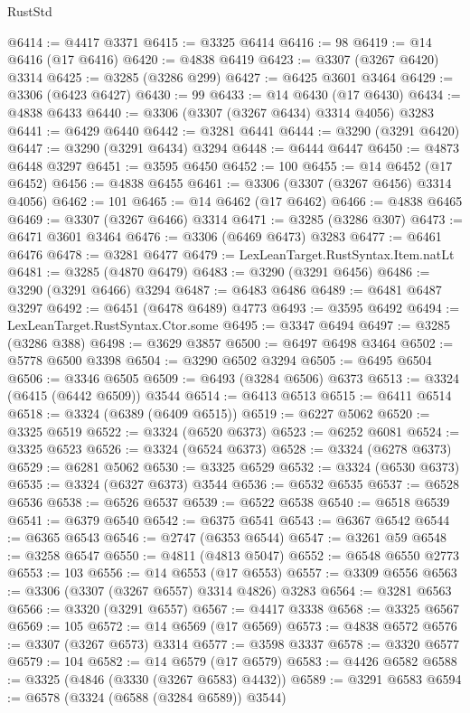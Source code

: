\begin{lexlean}{RustStd}
\begin{coremodule}
@6414 := @4417 @3371
@6415 := @3325 @6414
@6416 := 98
@6419 := @14 @6416 (@17 @6416)
@6420 := @4838 @6419
@6423 := @3307 (@3267 @6420) @3314
@6425 := @3285 (@3286 @299)
@6427 := @6425 @3601 @3464
@6429 := @3306 (@6423 @6427)
@6430 := 99
@6433 := @14 @6430 (@17 @6430)
@6434 := @4838 @6433
@6440 := @3306 (@3307 (@3267 @6434) @3314 @4056) @3283
@6441 := @6429 @6440
@6442 := @3281 @6441
@6444 := @3290 (@3291 @6420)
@6447 := @3290 (@3291 @6434) @3294
@6448 := @6444 @6447
@6450 := @4873 @6448 @3297
@6451 := @3595 @6450
@6452 := 100
@6455 := @14 @6452 (@17 @6452)
@6456 := @4838 @6455
@6461 := @3306 (@3307 (@3267 @6456) @3314 @4056)
@6462 := 101
@6465 := @14 @6462 (@17 @6462)
@6466 := @4838 @6465
@6469 := @3307 (@3267 @6466) @3314
@6471 := @3285 (@3286 @307)
@6473 := @6471 @3601 @3464
@6476 := @3306 (@6469 @6473) @3283
@6477 := @6461 @6476
@6478 := @3281 @6477
@6479 := LexLeanTarget.RustSyntax.Item.natLt
@6481 := @3285 (@4870 @6479)
@6483 := @3290 (@3291 @6456)
@6486 := @3290 (@3291 @6466) @3294
@6487 := @6483 @6486
@6489 := @6481 @6487 @3297
@6492 := @6451 (@6478 @6489) @4773
@6493 := @3595 @6492
@6494 := LexLeanTarget.RustSyntax.Ctor.some
@6495 := @3347 @6494
@6497 := @3285 (@3286 @388)
@6498 := @3629 @3857
@6500 := @6497 @6498 @3464
@6502 := @5778 @6500 @3398
@6504 := @3290 @6502 @3294
@6505 := @6495 @6504
@6506 := @3346 @6505
@6509 := @6493 (@3284 @6506) @6373
@6513 := @3324 (@6415 (@6442 @6509)) @3544
@6514 := @6413 @6513
@6515 := @6411 @6514
@6518 := @3324 (@6389 (@6409 @6515))
@6519 := @6227 @5062
@6520 := @3325 @6519
@6522 := @3324 (@6520 @6373)
@6523 := @6252 @6081
@6524 := @3325 @6523
@6526 := @3324 (@6524 @6373)
@6528 := @3324 (@6278 @6373)
@6529 := @6281 @5062
@6530 := @3325 @6529
@6532 := @3324 (@6530 @6373)
@6535 := @3324 (@6327 @6373) @3544
@6536 := @6532 @6535
@6537 := @6528 @6536
@6538 := @6526 @6537
@6539 := @6522 @6538
@6540 := @6518 @6539
@6541 := @6379 @6540
@6542 := @6375 @6541
@6543 := @6367 @6542
@6544 := @6365 @6543
@6546 := @2747 (@6353 @6544)
@6547 := @3261 @59
@6548 := @3258 @6547
@6550 := @4811 (@4813 @5047)
@6552 := @6548 @6550 @2773
@6553 := 103
@6556 := @14 @6553 (@17 @6553)
@6557 := @3309 @6556
@6563 := @3306 (@3307 (@3267 @6557) @3314 @4826) @3283
@6564 := @3281 @6563
@6566 := @3320 (@3291 @6557)
@6567 := @4417 @3338
@6568 := @3325 @6567
@6569 := 105
@6572 := @14 @6569 (@17 @6569)
@6573 := @4838 @6572
@6576 := @3307 (@3267 @6573) @3314
@6577 := @3598 @3337
@6578 := @3320 @6577
@6579 := 104
@6582 := @14 @6579 (@17 @6579)
@6583 := @4426 @6582
@6588 := @3325 (@4846 (@3330 (@3267 @6583) @4432))
@6589 := @3291 @6583
@6594 := @6578 (@3324 (@6588 (@3284 @6589)) @3544)

\end{coremodule}
\end{lexlean}

